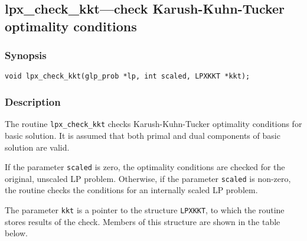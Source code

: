 \subsection{lpx\_check\_kkt---check Karush-Kuhn-Tucker optimality
conditions}

\subsubsection*{Synopsis}

\begin{verbatim}
void lpx_check_kkt(glp_prob *lp, int scaled, LPXKKT *kkt);
\end{verbatim}

\subsubsection*{Description}

The routine \verb|lpx_check_kkt| checks Karush-Kuhn-Tucker optimality
conditions for basic solution. It is assumed that both primal and dual
components of basic solution are valid.

If the parameter \verb|scaled| is zero, the optimality conditions are
checked for the original, unscaled LP problem. Otherwise, if the
parameter \verb|scaled| is non-zero, the routine checks the conditions
for an internally scaled LP problem.

The parameter \verb|kkt| is a pointer to the structure \verb|LPXKKT|,
to which the routine stores results of the check. Members of this
structure are shown in the table below.


